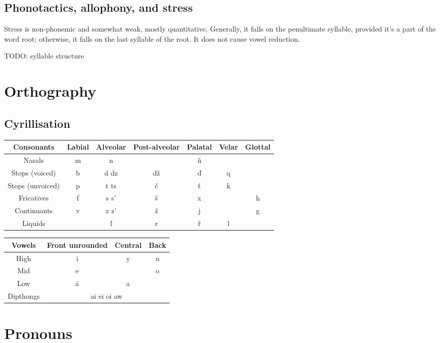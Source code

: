\documentclass[12pt]{article}
\begin{document}
	\subsection{Phonotactics, allophony, and stress}

	Stress is non-phonemic and somewhat weak, mostly quantitative. Generally, it falls on the penultimate syllable, provided it's a part of the word root; otherwise, it falls on the last syllable of the root. It does not cause vowel reduction.

	TODO: syllable structure

	\section{Orthography}
	
	\subsection{Cyrillisation} 

	\begin{tabular}{||c | c c c c c c ||}
		\hline
		Consonants & Labial & Alveolar &
		Post-alveolar & Palatal & Velar & Glottal \\
		\hline
		Nasals & m & n & & ň & & \\
		Stops (voiced)   & b & d dz & dž & ď & q & \\
		Stops (unvoiced) & p & t ts & č & ť & k & \\
		Fricatives & f & s s' & š & x & & h \\
		Continuants & v & z z' & ž & j & & g \\
		Liquids & & ľ & r & ř & l & \\
		\hline
	\end{tabular}

	\begin{tabular}{|| c | c c c || }
		\hline
		Vowels & Front unrounded & Central & Back \\
		\hline
		High & i & y & u \\
		Mid & e &  & o \\
		Low & ä & a & \\
		Dipthongs & \multicolumn{3}{c||}{ai ei oi aw} \\
		\hline
	\end{tabular}

	\section{Pronouns}
\end{document}
